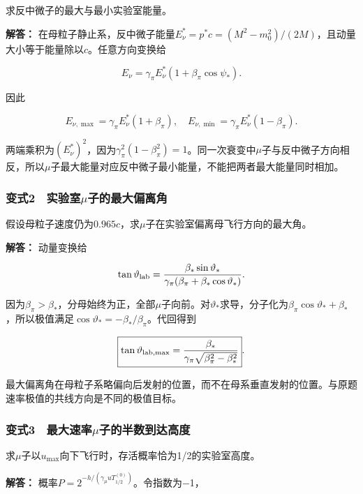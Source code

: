 \documentclass[12pt,a4paper,fontset=fandol]{ctexart}
\begin{document}
求反中微子的最大与最小实验室能量。

\textbf{解答：}
在母粒子静止系，反中微子能量\(E_\nu^*=p^*c=(M^2-m_0^2)/(2M)\)，且动量大小等于能量除以\(c\)。任意方向变换给

\[
E_\nu=\gamma_\pi E_\nu^*(1+\beta_\pi\cos\psi_*).
\]

因此

\[
\boxed{
E_{\nu,\max}=\gamma_\pi E_\nu^*(1+\beta_\pi),\quad
E_{\nu,\min}=\gamma_\pi E_\nu^*(1-\beta_\pi)}.
\]

两端乘积为\((E_\nu^*)^2\)，因为\(\gamma_\pi^2(1-\beta_\pi^2)=1\)。同一次衰变中\(\mu\)子与反中微子方向相反，所以\(\mu\)子最大能量对应反中微子最小能量，不能把两者最大能量同时相加。

\subsubsection{\texorpdfstring{变式2　实验室\(\mu\)子的最大偏离角}{变式2　实验室\textbackslash mu子的最大偏离角}}\label{ux53d8ux5f0f2-ux5b9eux9a8cux5ba4muux5b50ux7684ux6700ux5927ux504fux79bbux89d2}

假设母粒子速度仍为\(0.965c\)，求\(\mu\)子在实验室偏离母飞行方向的最大角。

\textbf{解答：} 动量变换给

\[
\tan\vartheta_{\rm lab}
=\frac{\beta_*\sin\vartheta_*}
{\gamma_\pi(\beta_\pi+\beta_*\cos\vartheta_*)}.
\]

因为\(\beta_\pi>\beta_*\)，分母始终为正，全部\(\mu\)子向前。对\(\vartheta_*\)求导，分子化为\(\beta_\pi\cos\vartheta_*+\beta_*\)，所以极值满足\(\cos\vartheta_*=-\beta_*/\beta_\pi\)。代回得到

\[
\boxed{
\tan\vartheta_{\rm lab,max}
=\frac{\beta_*}
{\gamma_\pi\sqrt{\beta_\pi^2-\beta_*^2}}}.
\]

最大偏离角在母粒子系略偏向后发射的位置，而不在母系垂直发射的位置。与原题速率极值的共线方向是不同的极值目标。

\subsubsection{\texorpdfstring{变式3　最大速率\(\mu\)子的半数到达高度}{变式3　最大速率\textbackslash mu子的半数到达高度}}\label{ux53d8ux5f0f3-ux6700ux5927ux901fux7387muux5b50ux7684ux534aux6570ux5230ux8fbeux9ad8ux5ea6}

求\(\mu\)子以\(u_{\max}\)向下飞行时，存活概率恰为1/2的实验室高度。

\textbf{解答：}
概率\(P=2^{-h/(\gamma_\mu uT_{1/2}^{(0)})}\)。令指数为−1，
\end{document}
